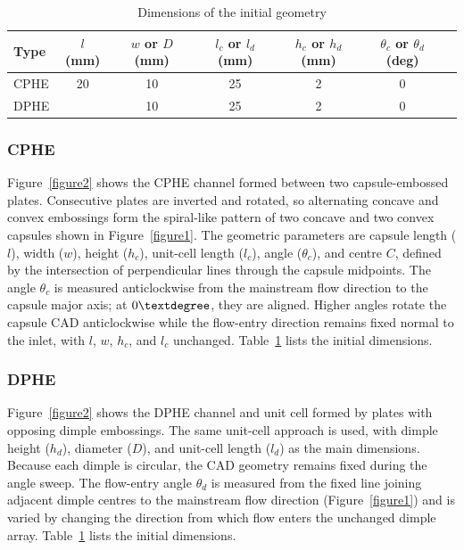 \documentclass[energies,article,submit,moreauthors,noheaderline]{Definitions/mdpi}
\newcommand{\degree}{\texorpdfstring{\ensuremath{^\circ}}{\textdegree}}
\def\ensuremath#1{}%
\def\degree{\textdegree}%
\begin{document}
\begin{table}[H]
\centering
\caption{Dimensions of the initial geometry}
\label{tab:dim-initial}
\renewcommand{\arraystretch}{1.3}
\begin{tabular}{lcccccc}
\hline
\textbf{Type} & $l$ (mm) & $w$ or $D$ (mm) & $l_c$ or $l_d$ (mm) & $h_c$ or $h_d$(mm) & $\theta_c$ or $\theta_d$ (deg) \\
\hline
CPHE & 20 & 10 & 25 & 2 & 0\degree \\
\hline
DPHE &  & 10 & 25 & 2 & 0\degree \\
\hline
\end{tabular}
\end{table}

\subsubsection{CPHE}
\label{sec:cphe_geometry}

Figure~\ref{figure2} shows the CPHE channel formed between two capsule-embossed plates. Consecutive plates are inverted and rotated, so alternating concave and convex embossings form the spiral-like pattern of two concave and two convex capsules shown in Figure~\ref{figure1}. The geometric parameters are capsule length ($l$), width ($w$), height ($h_c$), unit-cell length ($l_c$), angle ($\theta_c$), and centre $C$, defined by the intersection of perpendicular lines through the capsule midpoints. The angle $\theta_c$ is measured anticlockwise from the mainstream flow direction to the capsule major axis; at $0\degree$, they are aligned. Higher angles rotate the capsule CAD anticlockwise while the flow-entry direction remains fixed normal to the inlet, with $l$, $w$, $h_c$, and $l_c$ unchanged. Table~\ref{tab:dim-initial} lists the initial dimensions.

\subsubsection{DPHE}
\label{sec:dphe_geometry}

Figure~\ref{figure2} shows the DPHE channel and unit cell formed by plates with opposing dimple embossings. The same unit-cell approach is used, with dimple height ($h_d$), diameter ($D$), and unit-cell length ($l_d$) as the main dimensions. Because each dimple is circular, the CAD geometry remains fixed during the angle sweep. The flow-entry angle $\theta_d$ is measured from the fixed line joining adjacent dimple centres to the mainstream flow direction (Figure~\ref{figure1}) and is varied by changing the direction from which flow enters the unchanged dimple array. Table~\ref{tab:dim-initial} lists the initial dimensions.
\end{document}

